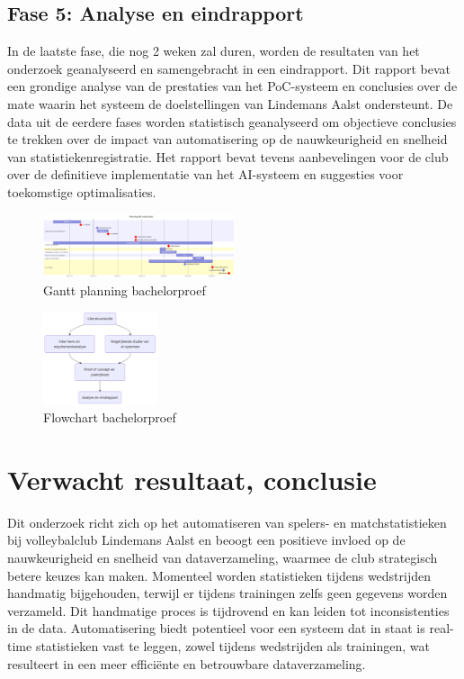 \subsection{Fase 5: Analyse en eindrapport}
In de laatste fase, die nog 2 weken zal duren, worden de resultaten van het onderzoek geanalyseerd en samengebracht in een eindrapport. Dit rapport bevat een grondige analyse van de prestaties van het PoC-systeem en conclusies over de mate waarin het systeem de doelstellingen van Lindemans Aalst ondersteunt. De data uit de eerdere fases worden statistisch geanalyseerd om objectieve conclusies te trekken over de impact van automatisering op de nauwkeurigheid en snelheid van statistiekenregistratie. Het rapport bevat tevens aanbevelingen voor de club over de definitieve implementatie van het AI-systeem en suggesties voor toekomstige optimalisaties.

\begin{figure}[ht]
  \centering
  \includegraphics[width=0.5\textwidth]{img/gantt.png}
  \caption{\label{fig:gantt}Gantt planning bachelorproef}
\end{figure}

\begin{figure}[ht]
  \centering
  \includegraphics[width=0.3\textwidth]{img/flowchart.png}
  \caption{\label{fig:flowchart}Flowchart bachelorproef}
\end{figure}

\section{Verwacht resultaat, conclusie}%
\label{sec:verwachte_resultaten}

Dit onderzoek richt zich op het automatiseren van spelers- en matchstatistieken bij volleybalclub Lindemans Aalst en beoogt een positieve invloed op de nauwkeurigheid en snelheid van dataverzameling, waarmee de club strategisch betere keuzes kan maken. Momenteel worden statistieken tijdens wedstrijden handmatig bijgehouden, terwijl er tijdens trainingen zelfs geen gegevens worden verzameld. Dit handmatige proces is tijdrovend en kan leiden tot inconsistenties in de data. Automatisering biedt potentieel voor een systeem dat in staat is real-time statistieken vast te leggen, zowel tijdens wedstrijden als trainingen, wat resulteert in een meer efficiënte en betrouwbare dataverzameling.

